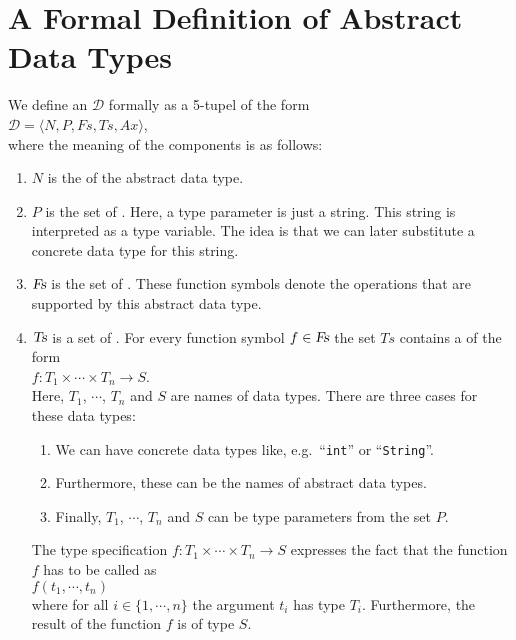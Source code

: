 \section[Formal Definition]{A Formal Definition of Abstract Data Types}
We define an  $\mathcal{D}$ formally as a 5-tupel of the form
\\[0.2cm]
\hspace*{1.3cm}
 $\mathcal{D} = \langle N, P, Fs, Ts, Ax \rangle$,
\\[0.2cm] 
where the meaning of the components is as follows:
\begin{enumerate}
\item $N$ is the  of the abstract data type.
\item $P$ is the set of .   Here, a type parameter is just a string.
      This string is interpreted as a type variable.  The idea is that we can later substitute 
      a concrete data type for this string.
\item $\textsl{Fs}$ is the set of .  These function symbols denote the 
      operations that are supported by this abstract data type.
\item $\textsl{Ts}$ is a set of .  For every function symbol
      $f \in \textsl{Fs}$
      the set $Ts$ contains a  of the form 
      \\[0.2cm]
      \hspace*{1.3cm} 
      $f: T_1 \times \cdots \times T_n \rightarrow S$. 
      \\[0.2cm]
      Here,  $T_1$, $\cdots$, $T_n$ and $S$ are names of data types.  There are three cases for
      these data types: 
      \begin{enumerate}
      \item We can have concrete data types like, e.g.~``\texttt{int}'' or ``\texttt{String}''.
      \item Furthermore, these can be the names of abstract data types.
      \item Finally,  $T_1$, $\cdots$, $T_n$ and $S$ can be type parameters from the set $P$.
      \end{enumerate}
      The type specification $f: T_1 \times \cdots \times T_n \rightarrow S$ expresses the fact that
      the function $f$ has to be called as \\[0.2cm] 
      \hspace*{1.3cm}
      $f(t_1,\cdots,t_n)$ 
      \\[0.2cm]
      where for all $i \in \{1,\cdots,n\}$ the argument $t_i$ has type 
      $T_i$.  Furthermore, the result of the function $f$ is of type $S$.


\end{enumerate}

